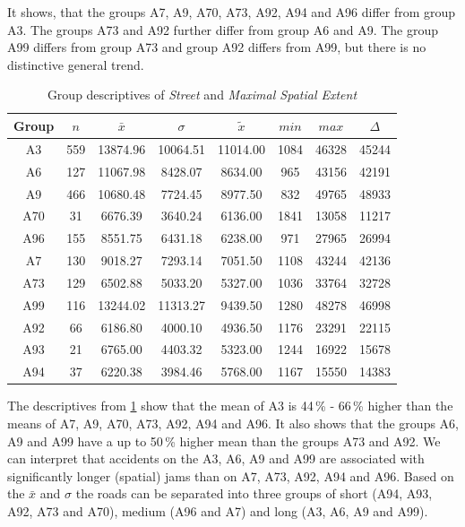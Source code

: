 It shows, that the groups A7, A9, A70, A73, A92, A94 and A96 differ from group A3. The groups A73 and A92 further differ from group A6 and A9. The group A99 differs from group A73 and group A92 differs from A99, but there is no distinctive general trend.
\begin{table}[ht!]
	\tiny
	\centering
	\begin{tabular}{c|c|c|c|c|c|c|c}
		\toprule
		Group & $n$ & $\bar{x}$ & $\sigma$ & $\tilde{x}$ & $min$ & $max$ & $\Delta$ \\  
		\midrule
		A3  & 559 & 13874.96 & 10064.51 & 11014.00 & 1084 & 46328 & 45244 \\ 
		A6  & 127 & 11067.98 & 8428.07  & 8634.00  & 965  & 43156 & 42191 \\ 
		A9  & 466 & 10680.48 & 7724.45  & 8977.50  & 832  & 49765 & 48933 \\ 
		A70 & 31  & 6676.39  & 3640.24  & 6136.00  & 1841 & 13058 & 11217 \\ 
		A96 & 155 & 8551.75  & 6431.18  & 6238.00  & 971  & 27965 & 26994 \\ 
		A7  & 130 & 9018.27  & 7293.14  & 7051.50  & 1108 & 43244 & 42136 \\ 
		A73 & 129 & 6502.88  & 5033.20  & 5327.00  & 1036 & 33764 & 32728 \\ 
		A99 & 116 & 13244.02 & 11313.27 & 9439.50  & 1280 & 48278 & 46998 \\ 
		A92 & 66  & 6186.80  & 4000.10  & 4936.50  & 1176 & 23291 & 22115 \\ 
		A93 & 21  & 6765.00  & 4403.32  & 5323.00  & 1244 & 16922 & 15678 \\ 
		A94 & 37  & 6220.38  & 3984.46  & 5768.00  & 1167 & 15550 & 14383 \\ 
		\bottomrule
	\end{tabular}
	\caption{Group descriptives of \textit{Street} and \textit{Maximal Spatial Extent}}
	\label{tbl:descriptives_baysis_matched_Str_SMax}
\end{table}
The descriptives from \cref{tbl:descriptives_baysis_matched_Str_SMax} show that the mean of A3 is 44\,\% - 66\,\% higher than the means of A7, A9, A70, A73, A92, A94 and A96. It also shows that the groups A6, A9 and A99 have a up to 50\,\% higher mean than the groups A73 and A92. We can interpret that accidents on the A3, A6, A9 and A99 are associated with significantly longer (spatial) jams than on A7, A73, A92, A94 and A96. Based on the $\bar{x}$ and $\sigma$ the roads can be separated into three groups of short (A94, A93, A92, A73 and A70), medium (A96 and A7) and long (A3, A6, A9 and A99).

